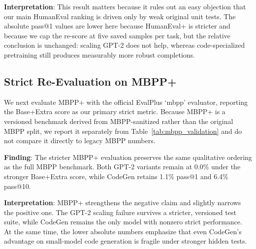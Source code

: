 \documentclass[preprint,12pt,authoryear]{elsarticle}
\begin{document}
\textbf{Interpretation}: This result matters because it rules out an easy objection that our main HumanEval ranking is driven only by weak original unit tests. The absolute pass@1 values are lower here because HumanEval+ is stricter and because we cap the re-score at five saved samples per task, but the relative conclusion is unchanged: scaling GPT-2 does not help, whereas code-specialized pretraining still produces measurably more robust completions.

\subsection{Strict Re-Evaluation on MBPP+}

We next evaluate MBPP+ with the official EvalPlus `mbpp' evaluator, reporting the Base+Extra score as our primary strict metric. Because MBPP+ is a versioned benchmark derived from MBPP-sanitized rather than the original MBPP split, we report it separately from Table~\ref{tab:mbpp_validation} and do not compare it directly to legacy MBPP numbers.

\begin{table}[t]
\centering
\caption{Strict MBPP+ Re-scoring with EvalPlus}
\label{tab:mbpp_plus}
\scriptsize
{}
\end{table}

\textbf{Finding}: The stricter MBPP+ evaluation preserves the same qualitative ordering as the full MBPP benchmark. Both GPT-2 variants remain at 0.0\% under the stronger Base+Extra score, while CodeGen retains 1.1\% pass@1 and 6.4\% pass@10.

\textbf{Interpretation}: MBPP+ strengthens the negative claim and slightly narrows the positive one. The GPT-2 scaling failure survives a stricter, versioned test suite, while CodeGen remains the only model with nonzero strict performance. At the same time, the lower absolute numbers emphasize that even CodeGen's advantage on small-model code generation is fragile under stronger hidden tests.
\end{document}

